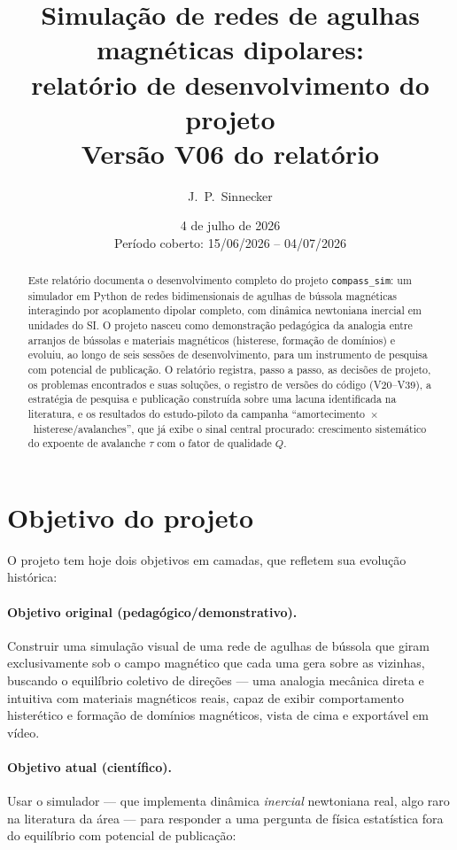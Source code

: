 \documentclass[11pt,a4paper]{article}
\title{\textbf{Simulação de redes de agulhas magnéticas dipolares:\\
relatório de desenvolvimento do projeto \code{compass\_sim}}\\[1ex]
\large Versão V06 do relatório}
\author{J.~P.~Sinnecker}
\date{4 de julho de 2026\\[0.5ex]
\small Período coberto: 15/06/2026 -- 04/07/2026}
\newcommand{\code}[1]{\texttt{#1}}
\begin{document}
\maketitle

\begin{abstract}
\noindent
Este relatório documenta o desenvolvimento completo do projeto
\code{compass\_sim}: um simulador em Python de redes bidimensionais de
agulhas de bússola magnéticas interagindo por acoplamento dipolar
completo, com dinâmica newtoniana inercial em unidades do SI. O projeto
nasceu como demonstração pedagógica da analogia entre arranjos de
bússolas e materiais magnéticos (histerese, formação de domínios) e
evoluiu, ao longo de seis sessões de desenvolvimento, para um
instrumento de pesquisa com potencial de publicação. O relatório
registra, passo a passo, as decisões de projeto, os problemas
encontrados e suas soluções, o registro de versões do código
(V20--V39), a estratégia de pesquisa e publicação construída sobre uma
lacuna identificada na literatura, e os resultados do estudo-piloto da
campanha ``amortecimento~$\times$~histerese/avalanches'', que já exibe o
sinal central procurado: crescimento sistemático do expoente de
avalanche $\tau$ com o fator de qualidade $Q$.
\end{abstract}

\tableofcontents
\newpage

\section{Objetivo do projeto}

O projeto tem hoje dois objetivos em camadas, que refletem sua evolução
histórica:

\paragraph{Objetivo original (pedagógico/demonstrativo).}
Construir uma simulação visual de uma rede de agulhas de bússola que
giram exclusivamente sob o campo magnético que cada uma gera sobre as
vizinhas, buscando o equilíbrio coletivo de direções --- uma analogia
mecânica direta e intuitiva com materiais magnéticos reais, capaz de
exibir comportamento histerético e formação de domínios magnéticos,
vista de cima e exportável em vídeo.

\paragraph{Objetivo atual (científico).}
Usar o simulador --- que implementa dinâmica \emph{inercial} newtoniana
real, algo raro na literatura da área --- para responder a uma pergunta
de física estatística fora do equilíbrio com potencial de publicação:
\end{document}

